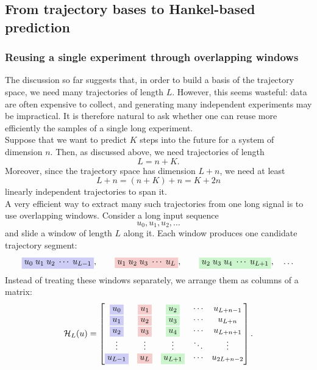 \subsection{From trajectory bases to Hankel-based prediction}
\subsubsection{Reusing a single experiment through overlapping windows}
The discussion so far suggests that, in order to build a basis of the trajectory space, we need many trajectories of length $L$. However, this seems wasteful: data are often expensive to collect, and generating many independent experiments may be impractical. It is therefore natural to ask whether one can reuse more efficiently the samples of a single long experiment.\\
Suppose that we want to predict $K$ steps into the future for a system of dimension $n$. Then, as discussed above, we need trajectories of length
\[
L=n+K.
\]
Moreover, since the trajectory space has dimension $L+n$, we need at least
\[
L+n=(n+K)+n=K+2n
\]
linearly independent trajectories to span it.\\
A very efficient way to extract many such trajectories from one long signal is to use overlapping windows. Consider a long input sequence
\[
u_0,u_1,u_2,\dots
\]
and slide a window of length $L$ along it. Each window produces one candidate trajectory segment:
\[
\colorbox{lightblue}{$\displaystyle u_0\;u_1\;u_2\;\cdots\;u_{L-1}$},
\qquad
\colorbox{lightred}{$\displaystyle u_1\;u_2\;u_3\;\cdots\;u_L$},
\qquad
\colorbox{lightgreen}{$\displaystyle u_2\;u_3\;u_4\;\cdots\;u_{L+1}$},
\quad \dots
\]
Instead of treating these windows separately, we arrange them as columns of a matrix:
\[
\mathcal{H}_L(u)=
\begin{bmatrix}
\colorbox{lightblue}{$\displaystyle u_0$} & \colorbox{lightred}{$\displaystyle u_1$} & \colorbox{lightgreen}{$\displaystyle u_2$} & \cdots & u_{L+n-1}\\
\colorbox{lightblue}{$\displaystyle u_1$} & \colorbox{lightred}{$\displaystyle u_2$} & \colorbox{lightgreen}{$\displaystyle u_3$} & \cdots & u_{L+n}\\
\colorbox{lightblue}{$\displaystyle u_2$} & \colorbox{lightred}{$\displaystyle u_3$} & \colorbox{lightgreen}{$\displaystyle u_4$} & \cdots & u_{L+n+1}\\
\vdots & \vdots & \vdots & \ddots & \vdots\\
\colorbox{lightblue}{$\displaystyle u_{L-1}$} & \colorbox{lightred}{$\displaystyle u_L$} & \colorbox{lightgreen}{$\displaystyle u_{L+1}$} & \cdots & u_{2L+n-2}
\end{bmatrix}.
\]

